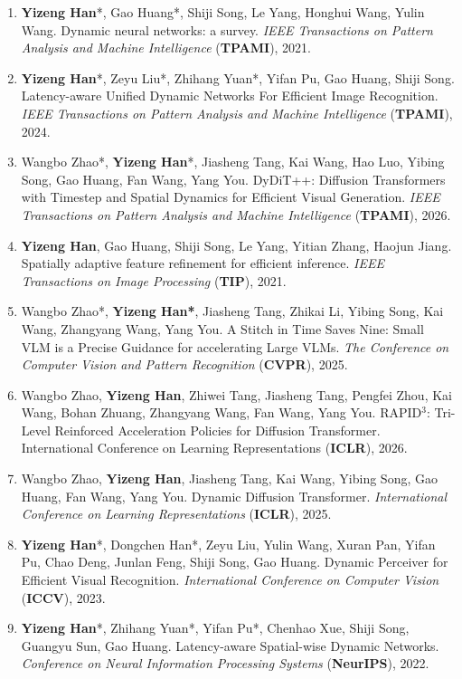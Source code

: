 \documentclass[10.5pt]{article}
\makeatletter
\newlength{\bibhang}
\newlength{\bibsep}
 {\@listi \global\bibsep\itemsep \global\advance\bibsep by\parsep}
\newenvironment{bibsection}%
        {\begin{enumerate}{%
       \setlength{\leftmargin}{-2em}%
       \setlength{\itemindent}{-2em}%
       \setlength{\itemsep}{\bibsep}%
        \setlength{\partopsep}{0pt}%
        \setlength{\topsep}{0pt}}}
        {\end{enumerate}\vspace{-.6\baselineskip}}
\makeatother
\begin{document}
\begin{sloppypar}
\begin{bibsection}
        \item \textbf{Yizeng Han}*, {Gao Huang*}, Shiji Song, Le Yang, Honghui Wang, Yulin Wang. Dynamic neural networks: a survey. \emph{IEEE Transactions on Pattern Analysis and Machine Intelligence} (\textbf{TPAMI}), 2021.
        \item \textbf{Yizeng Han}*, Zeyu Liu*, Zhihang Yuan*, Yifan Pu, Gao Huang, Shiji Song. Latency-aware Unified Dynamic Networks For Efficient Image Recognition. \emph{IEEE Transactions on Pattern Analysis and Machine Intelligence} (\textbf{TPAMI}), 2024.
        \item Wangbo Zhao*, \textbf{Yizeng Han}*, Jiasheng Tang, Kai Wang, Hao Luo, Yibing Song, Gao Huang, Fan Wang, Yang You. DyDiT++: Diffusion Transformers with Timestep and Spatial Dynamics for Efficient Visual Generation. \emph{IEEE Transactions on Pattern Analysis and Machine Intelligence} (\textbf{TPAMI}), 2026.
        \item \textbf{Yizeng Han}, {Gao Huang}, Shiji Song, Le Yang, Yitian Zhang, Haojun Jiang. Spatially adaptive feature refinement for efficient inference. \emph{IEEE Transactions on Image Processing} (\textbf{TIP}), 2021.
        \item Wangbo Zhao*, \textbf{Yizeng Han*}, Jiasheng Tang, Zhikai Li, Yibing Song, Kai Wang, Zhangyang Wang, Yang You. A Stitch in Time Saves Nine: Small VLM is a Precise Guidance for accelerating Large VLMs. \emph{The Conference on Computer Vision and Pattern Recognition} (\textbf{CVPR}), 2025.
        \item Wangbo Zhao, \textbf{Yizeng Han}, Zhiwei Tang, Jiasheng Tang, Pengfei Zhou, Kai Wang, Bohan Zhuang, Zhangyang Wang, Fan Wang, Yang You. RAPID$^3$: Tri-Level Reinforced Acceleration Policies for Diffusion Transformer. {International Conference on Learning Representations} (\textbf{ICLR}), 2026.
        \item Wangbo Zhao, \textbf{Yizeng Han}, Jiasheng Tang, Kai Wang, Yibing Song, Gao Huang, Fan Wang, Yang You. Dynamic Diffusion Transformer. \emph{International Conference on Learning Representations} (\textbf{ICLR}), 2025.
        \item \textbf{Yizeng Han}*, Dongchen Han*, Zeyu Liu, Yulin Wang, Xuran Pan, Yifan Pu, Chao Deng, Junlan Feng, Shiji Song, Gao Huang. Dynamic Perceiver for Efficient Visual Recognition. \emph{International Conference on Computer Vision} (\textbf{ICCV}), 2023.
        \item \textbf{Yizeng Han}*, {Zhihang Yuan*}, {Yifan Pu*}, Chenhao Xue, Shiji Song, Guangyu Sun, Gao Huang. Latency-aware Spatial-wise Dynamic Networks. \emph{Conference on Neural Information Processing Systems} (\textbf{NeurIPS}), 2022.

\end{bibsection}
\end{sloppypar}
\end{document}
